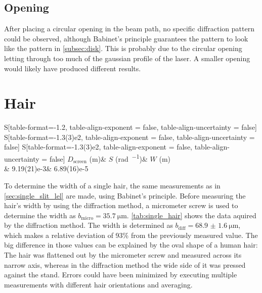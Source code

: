\subsection*{Opening}
After placing a circular opening in the beam path, no specific diffraction pattern could be observed, although Babinet's principle guarantees the pattern to look like the pattern in \autoref{subsec:disk}.
This is probably due to the circular opening letting through too much of the gaussian profile of the laser.
A smaller opening would likely have produced different results.

\section{Hair}
\begin{table}[b!]
	\centering
	\caption{Single hair width}
	\label{tab:single_hair}
	\begin{tabular}{
	S[table-format=-1.2, table-align-exponent = false, table-align-uncertainty = false]
	S[table-format=-1.3(3)e2, table-align-exponent = false, table-align-uncertainty = false]
	S[table-format=-1.3(3)e2, table-align-exponent = false, table-align-uncertainty = false]
	}
		\toprule
		{$D_\text{screen}$ (\si{\meter})}&	{$S$ (\si{\radian\per\order})}&	{$W$ (\si{\meter})}\\
		&   9.19(21)e-3&    6.89(16)e-5\\
		\bottomrule
	\end{tabular}
\end{table}
To determine the width of a single hair, the same measurements as in \autoref{sec:single_slit_lel} are made, using Babinet's principle.
Before measuring the hair's width by using the diffraction method, a micrometer screw is used to determine the width as $b_\text{micro} = \SI{35.7}{\micro\meter}$.
\autoref{tab:single_hair} shows the data aquired by the diffraction method.
The width is determined as $b_\text{diff} = \SI{68.9(16)}{\micro\meter}$, which makes a relative deviation of \num{93}\% from the previously measured value.
The big difference in those values can be explained by the oval shape of a human hair:
The hair was flattened out by the micrometer screw and measured across its narrow axis, whereas in the diffraction method the wide side of it was pressed against the stand.
Errors could have been minimized by executing multiple measurements with different hair orientations and averaging.
